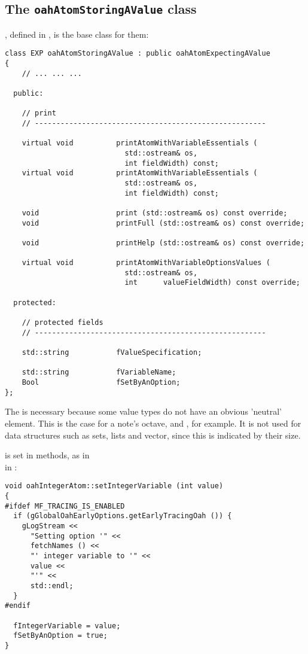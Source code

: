 \subsection{The {\tt oahAtomStoringAValue} class}

, defined in , is the base class   for them:
\begin{lstlisting}[language=CPlusPlus]
class EXP oahAtomStoringAValue : public oahAtomExpectingAValue
{
	// ... ... ...

  public:

    // print
    // ------------------------------------------------------

    virtual void          printAtomWithVariableEssentials (
                            std::ostream& os,
                            int fieldWidth) const;
    virtual void          printAtomWithVariableEssentials (
                            std::ostream& os,
                            int fieldWidth) const;

    void                  print (std::ostream& os) const override;
    void                  printFull (std::ostream& os) const override;

    void                  printHelp (std::ostream& os) const override;

    virtual void          printAtomWithVariableOptionsValues (
                            std::ostream& os,
                            int      valueFieldWidth) const override;

  protected:

    // protected fields
    // ------------------------------------------------------

    std::string           fValueSpecification;

    std::string           fVariableName;
    Bool                  fSetByAnOption;
};
\end{lstlisting}

The  is necessary because some value types do not have an obvious 'neutral' element. This is the case for a note's octave,  and , for example. It is not used for data structures such as sets, lists and vector, since this is indicated by their size.

 is set in  methods, as in \\
in :
\begin{lstlisting}[language=CPlusPlus]
void oahIntegerAtom::setIntegerVariable (int value)
{
#ifdef MF_TRACING_IS_ENABLED
  if (gGlobalOahEarlyOptions.getEarlyTracingOah ()) {
    gLogStream <<
      "Setting option '" <<
      fetchNames () <<
      "' integer variable to '" <<
      value <<
      "'" <<
      std::endl;
  }
#endif

  fIntegerVariable = value;
  fSetByAnOption = true;
}
\end{lstlisting}


